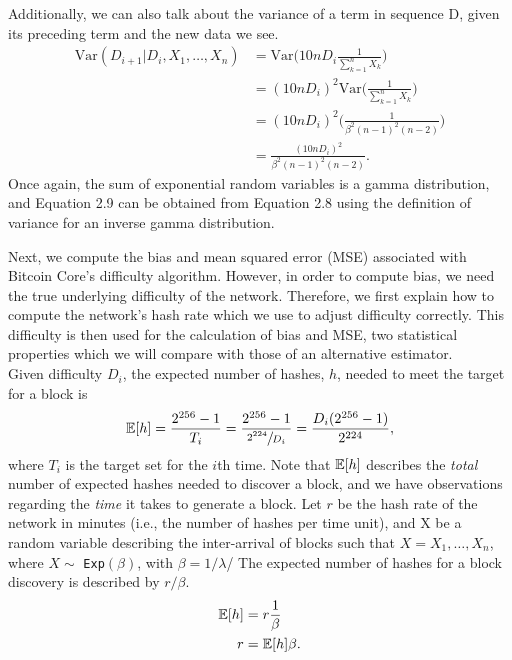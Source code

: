 Additionally, we can also talk about the variance of a term in sequence D, given its preceding term and the new data we see. 
\begin{align}
\text{Var}(D_{i+1} | D_{i}, X_1, \dots, X_{n}) &= \text{Var}\bigg(10n D_i \frac{1}{\sum_{k=1}^{n} X_k}\bigg) \\
&= (10n D_i)^2 \text{Var}\bigg(\frac{1}{\sum_{k=1}^{n} X_k}\bigg) \\ 
&= (10n D_i)^2 \Bigg(\frac{1}{\beta^2(n-1)^2(n-2)}\Bigg) \\
&= \frac{(10n D_i)^2}{\beta^2(n-1)^2(n-2)}.
\end{align}
Once again, the sum of exponential random variables is a gamma distribution, and Equation 2.9 can be obtained from Equation 2.8 using the definition of variance for an inverse gamma distribution.

Next, we compute the bias and mean squared error (MSE) associated with Bitcoin Core's difficulty algorithm. However, in order to compute bias, we need the true underlying difficulty of the network. Therefore, we first explain how to compute the network's hash rate which we use to adjust difficulty correctly. This difficulty is then used for the calculation of bias and MSE, two statistical properties which we will compare with those of an alternative estimator. \\
Given difficulty $D_i$, the expected number of hashes, $h$, needed to meet the target for a block is
\begin{align}
\operatorname{\mathbb{E}}[h] =  \frac{2^{256}-1}{T_i} = \frac{2^{256}-1}{\sfrac{2^{224}}{D_i}} = \frac{D_i(2^{256}-1)}{2^{224}}, 
\end{align}
where $T_i$ is the target set for the $i$th time. Note that $\operatorname{\mathbb{E}}[h]$ describes the \textit{total} number of expected hashes needed to discover a block, and we have observations regarding the \textit{time} it takes to generate a block. Let $r$ be the hash rate of the network in minutes (i.e., the number of hashes per time unit), and X be a random variable describing the inter-arrival of blocks such that $X = X_1, \dots, X_{n}$, where $X \sim$ \texttt{Exp}$(\beta)$, with $\beta = 1/\lambda$/ The expected number of hashes for a block discovery is described by $r/\beta$.
\begin{align}
\operatorname{\mathbb{E}}[h] &= r \frac{1}{\beta}  \\
r &= \operatorname{\mathbb{E}}[h] \beta.
\end{align}

